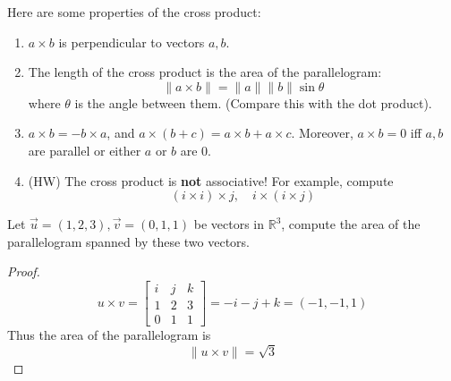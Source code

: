 \documentclass[openany]{book}
\newcommand{\R}{\mathbb{R}}
\begin{document}
\begin{prop}
    Here are some properties of the cross product:
    \begin{enumerate}
        \item $a\times b$ is perpendicular to vectors $a,b$.
        \item The length of the cross product is the area of the parallelogram:
        \begin{equation*}
            \|a\times b\|=\|a\|\|b\|\sin\theta
        \end{equation*}
        where $\theta$ is the angle between them. (Compare this with the dot product).
        \item $a\times b=-b\times a$, and $a\times (b+c)=a\times b+a\times c$. Moreover, $a\times b=0$ iff $a,b$ are parallel or either $a$ or $b$ are $0$.
        \item (HW) The cross product is \textbf{not} associative! For example, compute 
        \begin{equation*}
            (i\times i)\times j, \quad i\times (i\times j)
        \end{equation*}
    \end{enumerate}
\end{prop}




\begin{prob}
    Let $\vec{u}=(1,2,3), \vec{v}=(0,1,1)$ be vectors in $\R^3$, compute the area of the parallelogram spanned by these two vectors.
\end{prob}
\begin{proof}
    \begin{equation*}
        u\times v=\begin{bmatrix}
            i&j&k\\
            1&2&3\\
            0&1&1
        \end{bmatrix}=-i-j+k=(-1,-1,1)
    \end{equation*}
    Thus the area of the parallelogram is 
    \begin{equation*}
        \|u\times v\|=\sqrt{3}
    \end{equation*}
\end{proof}
\end{document}
